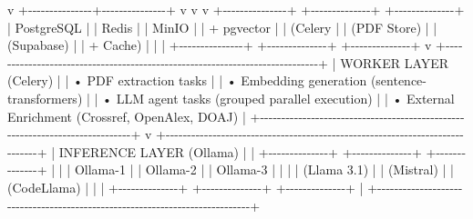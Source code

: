 \documentclass[
]{article}
\newenvironment{Shaded}{}{}
\newcommand{\NormalTok}[1]{#1}
\begin{document}
\begin{Shaded}
\begin{Highlighting}[]
\NormalTok{                            v}
\NormalTok{            +{-}{-}{-}{-}{-}{-}{-}{-}{-}{-}{-}{-}{-}{-}{-}+{-}{-}{-}{-}{-}{-}{-}{-}{-}{-}{-}{-}{-}{-}{-}+}
\NormalTok{            v               v               v}
\NormalTok{+{-}{-}{-}{-}{-}{-}{-}{-}{-}{-}{-}{-}{-}{-}{-}+  +{-}{-}{-}{-}{-}{-}{-}{-}{-}{-}{-}{-}{-}{-}+  +{-}{-}{-}{-}{-}{-}{-}{-}{-}{-}{-}{-}{-}{-}+}
\NormalTok{|  PostgreSQL   |  |    Redis     |  |    MinIO     |}
\NormalTok{|  + pgvector   |  |   (Celery    |  |  (PDF Store) |}
\NormalTok{|  (Supabase)   |  |   + Cache)   |  |              |}
\NormalTok{+{-}{-}{-}{-}{-}{-}{-}{-}{-}{-}{-}{-}{-}{-}{-}+  +{-}{-}{-}{-}{-}{-}{-}{-}{-}{-}{-}{-}{-}{-}+  +{-}{-}{-}{-}{-}{-}{-}{-}{-}{-}{-}{-}{-}{-}+}
\NormalTok{                            v}
\NormalTok{+{-}{-}{-}{-}{-}{-}{-}{-}{-}{-}{-}{-}{-}{-}{-}{-}{-}{-}{-}{-}{-}{-}{-}{-}{-}{-}{-}{-}{-}{-}{-}{-}{-}{-}{-}{-}{-}{-}{-}{-}{-}{-}{-}{-}{-}{-}{-}{-}{-}{-}{-}{-}{-}{-}{-}{-}{-}{-}{-}{-}{-}{-}{-}{-}{-}{-}{-}{-}{-}{-}{-}{-}{-}{-}{-}{-}{-}+}
\NormalTok{|                      WORKER LAYER (Celery)                                 |}
\NormalTok{|  • PDF extraction tasks                                                     |}
\NormalTok{|  • Embedding generation (sentence{-}transformers)                             |}
\NormalTok{|  • LLM agent tasks (grouped parallel execution)                             |}
\NormalTok{|  • External Enrichment (Crossref, OpenAlex, DOAJ)                           |}
\NormalTok{+{-}{-}{-}{-}{-}{-}{-}{-}{-}{-}{-}{-}{-}{-}{-}{-}{-}{-}{-}{-}{-}{-}{-}{-}{-}{-}{-}{-}{-}{-}{-}{-}{-}{-}{-}{-}{-}{-}{-}{-}{-}{-}{-}{-}{-}{-}{-}{-}{-}{-}{-}{-}{-}{-}{-}{-}{-}{-}{-}{-}{-}{-}{-}{-}{-}{-}{-}{-}{-}{-}{-}{-}{-}{-}{-}{-}{-}+}
\NormalTok{                            v}
\NormalTok{+{-}{-}{-}{-}{-}{-}{-}{-}{-}{-}{-}{-}{-}{-}{-}{-}{-}{-}{-}{-}{-}{-}{-}{-}{-}{-}{-}{-}{-}{-}{-}{-}{-}{-}{-}{-}{-}{-}{-}{-}{-}{-}{-}{-}{-}{-}{-}{-}{-}{-}{-}{-}{-}{-}{-}{-}{-}{-}{-}{-}{-}{-}{-}{-}{-}{-}{-}{-}{-}{-}{-}{-}{-}{-}{-}{-}{-}+}
\NormalTok{|                      INFERENCE LAYER (Ollama)                              |}
\NormalTok{|  +{-}{-}{-}{-}{-}{-}{-}{-}{-}{-}{-}{-}{-}{-}+  +{-}{-}{-}{-}{-}{-}{-}{-}{-}{-}{-}{-}{-}{-}+  +{-}{-}{-}{-}{-}{-}{-}{-}{-}{-}{-}{-}{-}{-}+                     |}
\NormalTok{|  |  Ollama{-}1    |  |  Ollama{-}2    |  |  Ollama{-}3    |                     |}
\NormalTok{|  |  (Llama 3.1) |  |  (Mistral)   |  |  (CodeLlama) |                     |}
\NormalTok{|  +{-}{-}{-}{-}{-}{-}{-}{-}{-}{-}{-}{-}{-}{-}+  +{-}{-}{-}{-}{-}{-}{-}{-}{-}{-}{-}{-}{-}{-}+  +{-}{-}{-}{-}{-}{-}{-}{-}{-}{-}{-}{-}{-}{-}+                     |}
\NormalTok{+{-}{-}{-}{-}{-}{-}{-}{-}{-}{-}{-}{-}{-}{-}{-}{-}{-}{-}{-}{-}{-}{-}{-}{-}{-}{-}{-}{-}{-}{-}{-}{-}{-}{-}{-}{-}{-}{-}{-}{-}{-}{-}{-}{-}{-}{-}{-}{-}{-}{-}{-}{-}{-}{-}{-}{-}{-}{-}{-}{-}{-}{-}{-}{-}{-}{-}{-}{-}{-}{-}{-}{-}{-}{-}{-}{-}{-}+}
\end{Highlighting}
\end{Shaded}
\end{document}
